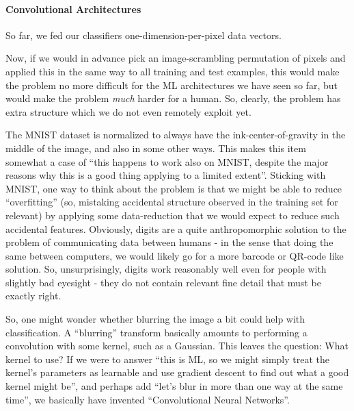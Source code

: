 \documentclass[11pt]{article}
\begin{document}
\hypertarget{convolutional-architectures}{%
\paragraph{\texorpdfstring{\textbf{Convolutional
Architectures}}{Convolutional Architectures}}\label{convolutional-architectures}}

So far, we fed our classifiers one-dimension-per-pixel data vectors.

Now, if we would in advance pick an image-scrambling permutation of
pixels and applied this in the same way to all training and test
examples, this would make the problem no more difficult for the ML
architectures we have seen so far, but would make the problem
\emph{much} harder for a human. So, clearly, the problem has extra
structure which we do not even remotely exploit yet.

The MNIST dataset is normalized to always have the ink-center-of-gravity
in the middle of the image, and also in some other ways. This makes this
item somewhat a case of ``this happens to work also on MNIST, despite
the major reasons why this is a good thing applying to a limited
extent''. Sticking with MNIST, one way to think about the problem is
that we might be able to reduce ``overfitting'' (so, mistaking
accidental structure observed in the training set for relevant) by
applying some data-reduction that we would expect to reduce such
accidental features. Obviously, digits are a quite anthropomorphic
solution to the problem of communicating data between humans - in the
sense that doing the same between computers, we would likely go for a
more barcode or QR-code like solution. So, unsurprisingly, digits work
reasonably well even for people with slightly bad eyesight - they do not
contain relevant fine detail that must be exactly right.

So, one might wonder whether blurring the image a bit could help with
classification. A ``blurring'' transform basically amounts to performing
a convolution with some kernel, such as a Gaussian. This leaves the
question: What kernel to use? If we were to answer ``this is ML, so we
might simply treat the kernel's parameters as learnable and use gradient
descent to find out what a good kernel might be'', and perhaps add
``let's blur in more than one way at the same time'', we basically have
invented ``Convolutional Neural Networks''.
\end{document}
